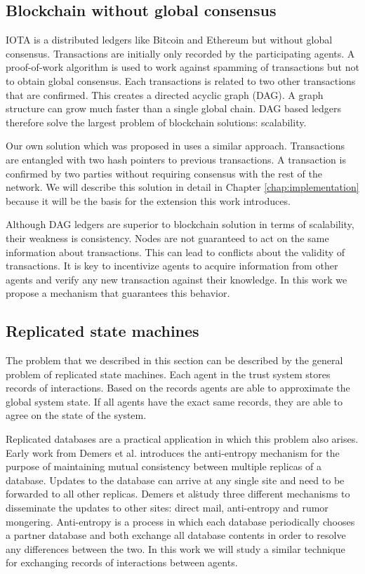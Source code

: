 \subsection{Blockchain without global consensus}
IOTA\cite{popov2016tangle} is a distributed ledgers like Bitcoin and Ethereum but without global 
consensus. Transactions are initially only recorded by the participating agents. A proof-of-work 
algorithm is used to work against spamming of transactions but not to obtain global consensus. Each
transactions is related to two other transactions that are confirmed. This creates a directed 
acyclic graph (DAG). A graph structure can grow much faster than a single global chain. DAG based 
ledgers therefore solve the largest problem of blockchain solutions: scalability.

Our own solution which was proposed in \cite{OTTE2017} uses a similar approach. Transactions are 
entangled with two hash pointers to previous transactions. A transaction is confirmed by two parties
without requiring consensus with the rest of the network. We will describe this solution in detail 
in Chapter \ref{chap:implementation} because it will be the basis for the extension this work
introduces. 

Although DAG ledgers are superior to blockchain solution in terms of scalability, their weakness is
consistency. Nodes are not guaranteed to act on the same information about transactions. This can 
lead to conflicts about the validity of transactions. It is key to incentivize agents to acquire 
information from other agents and verify any new transaction against their knowledge. In this work
we propose a mechanism that guarantees this behavior.


\subsection{Replicated state machines}
The problem that we described in this section can be described by the general problem of replicated 
state machines. Each agent in the trust system stores records of interactions. Based on the records
agents are able to approximate the global system state. If all agents have the exact same records, 
they are able to agree on the state of the system. 

Replicated databases are a practical application in which this problem also arises. Early work from
Demers et al.\cite{demers1987epidemic} introduces the anti-entropy mechanism
for the purpose of maintaining mutual consistency between multiple replicas of a database. Updates
to the database can arrive at any single site and need to be forwarded to all other replicas. Demers
et al\. study three different mechanisms to disseminate the updates to other sites: direct mail, 
anti-entropy and rumor mongering. Anti-entropy is a process in which each database periodically 
chooses a partner database and both exchange all database contents in order to resolve any 
differences between the two. In this work we will study a similar technique for exchanging records
of interactions between agents. 

